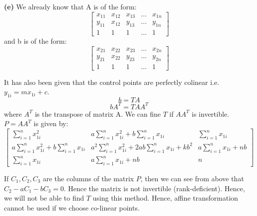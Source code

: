 \documentclass[12pt]{article}
\begin{document}
\textbf{(e)}
We already know that A is of the form:
\[
    \begin{bmatrix}
        x_{11} & x_{12} & x_{13} & \dots & x_{1n} \\
        y_{11} & x_{12} & y_{13} & \dots & y_{1n} \\
        1 & 1 & 1 & \dots & 1
    \end{bmatrix}
\]
and b is of the form:
\[
    \begin{bmatrix}
        x_{21} & x_{22} & x_{23} & \dots & x_{2n} \\
        y_{21} & x_{22} & y_{23} & \dots & y_{2n} \\
        1 & 1 & 1 & \dots & 1
    \end{bmatrix}
\]

It has also been given that the control points are perfectly colinear i.e. $y_{1i} = mx_{1i}+c$. 
\[b = TA\]
\[bA^T = TAA^T\]
where $A^T$ is the transpose of matrix A. We can fine $T$ if $AA^T$ is invertible. $P = AA^T$ is given by:
\[
    \begin{bmatrix}
        \sum_{i=1}^nx_{1i}^2 & a\sum_{i=1}^nx_{1i}^2 + b\sum_{i=1}^nx_{1i} & \sum_{i=1}^nx_{1i}\\
        a\sum_{i=1}^nx_{1i}^2 + b\sum_{i=1}^nx_{1i} &  a^2\sum_{i=1}^nx_{1i}^2 + 2ab\sum_{i=1}^nx_{1i} + kb^2 & a\sum_{i=1}^nx_{1i} + nb\\
        \sum_{i=1}^nx_{1i} & a\sum_{i=1}^nx_{1i} + nb & n
    \end{bmatrix}
\]

If $C_1, C_2, C_3$ are the columns of the matrix $P$, then we can see from above that $C_2 - aC_1 - bC_3 = 0$. Hence the matrix is not invertible (rank-deficient). Hence, we will not be able to find $T$ using this method. Hence, affine transformation cannot be used if we choose co-linear points.
\end{document}

